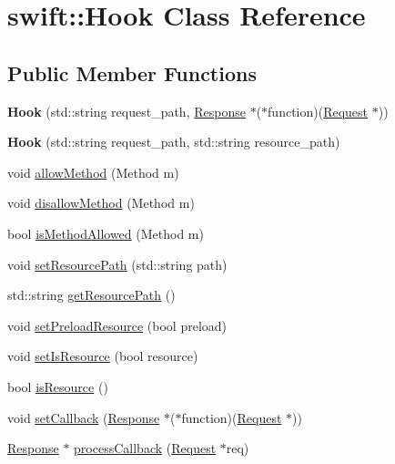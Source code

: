 \hypertarget{classswift_1_1_hook}{\section{swift\-:\-:Hook Class Reference}
\label{classswift_1_1_hook}
}
\subsection*{Public Member Functions}
\begin{DoxyCompactItemize}
\item 
\hypertarget{classswift_1_1_hook_a8e9f35346f4797a6149a79c7a34235fd}{{\bfseries Hook} (std\-::string request\-\_\-path, \hyperlink{classswift_1_1_response}{Response} $\ast$($\ast$function)(\hyperlink{classswift_1_1_request}{Request} $\ast$))}\label{classswift_1_1_hook_a8e9f35346f4797a6149a79c7a34235fd}

\item 
\hypertarget{classswift_1_1_hook_a08e8c205418d4dc95a24ad10f0a6754e}{{\bfseries Hook} (std\-::string request\-\_\-path, std\-::string resource\-\_\-path)}\label{classswift_1_1_hook_a08e8c205418d4dc95a24ad10f0a6754e}

\item 
void \hyperlink{classswift_1_1_hook_ab8f2a030f4234be5aaea657628414669}{allow\-Method} (Method m)
\item 
void \hyperlink{classswift_1_1_hook_a02148f71598a14eb8c7f42d9c82f50cb}{disallow\-Method} (Method m)
\item 
bool \hyperlink{classswift_1_1_hook_ad5e71e832b6290d4f195a5dcd594e661}{is\-Method\-Allowed} (Method m)
\item 
void \hyperlink{classswift_1_1_hook_a4147575b0d54691515271508baa428c8}{set\-Resource\-Path} (std\-::string path)
\item 
std\-::string \hyperlink{classswift_1_1_hook_a6754120ec1ace56091e2e794bc9df635}{get\-Resource\-Path} ()
\item 
void \hyperlink{classswift_1_1_hook_a8fc8a844df53bc651a46f9616ee635f9}{set\-Preload\-Resource} (bool preload)
\item 
void \hyperlink{classswift_1_1_hook_aeefe2c2e5080787975097a7c1b431161}{set\-Is\-Resource} (bool resource)
\item 
bool \hyperlink{classswift_1_1_hook_addbf2c39d6628c838b6fb46c96469e31}{is\-Resource} ()
\item 
void \hyperlink{classswift_1_1_hook_aa1fd10e80b74ee88885d3b7225cf0c90}{set\-Callback} (\hyperlink{classswift_1_1_response}{Response} $\ast$($\ast$function)(\hyperlink{classswift_1_1_request}{Request} $\ast$))
\item 
\hyperlink{classswift_1_1_response}{Response} $\ast$ \hyperlink{classswift_1_1_hook_a1f1005a2e758eeb8776572edb2419932}{process\-Callback} (\hyperlink{classswift_1_1_request}{Request} $\ast$req)
\end{DoxyCompactItemize}


